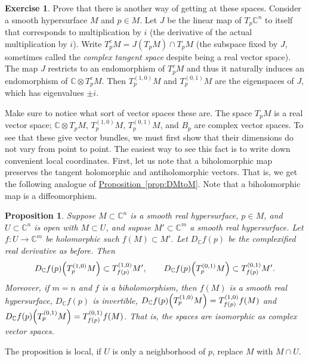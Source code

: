 \documentclass[12pt,openany]{book}
\newcommand{\avoidbreak}{\postdisplaypenalty=100}
\newcommand{\C}{{\mathbb{C}}}
\newcommand{\myindex}[1]{#1\index{#1}}
\theoremstyle{plain}
\newtheorem{prop}[thm]{Proposition}
\theoremstyle{remark}
\theoremstyle{definition}
\newenvironment{exbox}{%
    \def\FrameCommand{\vrule width 1pt \relax\hspace{10pt}}%
    \MakeFramed{\advance\hsize-\width\FrameRestore}%
}{%
    \endMakeFramed
}
\theoremstyle{exercise}
\newtheorem{exercise}{Exercise}[section]
\theoremstyle{example}
\newcommand{\propref}[1]{\hyperref[#1]{Proposition~\ref*{#1}}}
\begin{document}
\begin{exbox}
\begin{exercise}
Prove that there is another way of getting at these spaces.  Consider a smooth
hypersurface $M$ and $p \in M$.  Let $J$ be the linear map of $T_p \C^n$ to
itself that corresponds to multiplication by $i$
(the derivative of the actual multiplication by $i$).
Write $T^c_p M = J(T_p M) \cap T_pM$ (the subspace fixed by $J$, sometimes
called the \emph{\myindex{complex tangent space}} despite being a real
vector space).
The map $J$ restricts to an endomorphism of $T^c_pM$ and thus it naturally induces 
an endomorphism of $\C \otimes T^c_pM$.
Then $T^{(1,0)}_pM$ and 
$T^{(0,1)}_pM$ are the eigenspaces of $J$, which has eigenvalues $\pm i$.
\end{exercise}
\end{exbox}

Make sure to notice what sort of vector spaces these are.
The space $T_pM$ is a real vector space;
$\C \otimes T_pM$, $T_p^{(1,0)}M$, $T_p^{(0,1)} M$, and $B_p$
are complex vector spaces.
To see that these give vector bundles,
we must first show that their dimensions do not vary
from point to point.  The easiest way to see this fact is to write down
convenient local coordinates.  First, let us note that
a biholomorphic map preserves the tangent holomorphic and antiholomorphic
vectors.  That is, we get the following
analogue of \propref{prop:DMtoM}.
Note that a biholomorphic map is a diffeomorphism.

\begin{prop} \label{prop:whereTgoeshol}
Suppose $M \subset \C^n$ is a smooth real hypersurface, $p \in M$,
and $U \subset \C^n$ is open with $M \subset U$, and supose $M' \subset
\C^m$ a smooth real hypersurface.
Let $f \colon U \to \C^m$ be holomorphic such $f(M) \subset M'$.
Let $D_\C f(p)$ be
the complexified real derivative as before.  Then
\begin{equation*}
D_\C f(p)\Bigl(T_p^{(1,0)}M\Bigr) \subset T_{f(p)}^{(1,0)}M', \qquad
D_\C f(p)\Bigl(T_p^{(0,1)}M\Bigr) \subset T_{f(p)}^{(0,1)}M'.
\avoidbreak
\end{equation*}
Moreover, if $m=n$ and $f$ is a biholomorphism,
then $f(M)$ is a smooth real hypersurface,
$D_\C f(p)$ is invertible,
$D_\C f(p)\Bigl(T_p^{(1,0)}M\Bigr) = T_{f(p)}^{(1,0)} f(M)$
and
$D_\C f(p)\Bigl(T_p^{(0,1)}M\Bigr) = T_{f(p)}^{(0,1)} f(M)$.
That is, the spaces are isomorphic as complex vector spaces.
\end{prop}

The proposition is local, if $U$ is only a neighborhood of $p$,
replace $M$ with $M \cap U$.
\end{document}
